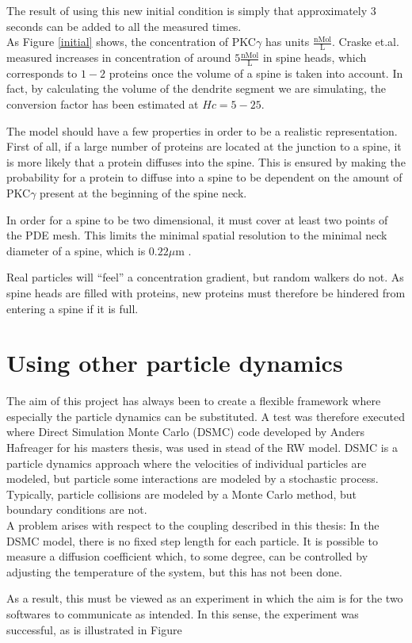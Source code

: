 \noindent The result of using this new initial condition is simply that approximately $3$ seconds can be added to all the measured times. \\

As Figure \ref{initial} shows, the concentration of PKC$\gamma$ has units $\frac{\text{nMol}}{\text{L}}$. 
Craske et.al. \cite{craske2005spines} measured increases in concentration of around $5\frac{\text{nMol}}{\text{L}}$ in spine heads, which corresponds to $1-2$ proteins once the volume of a spine is taken into account. 
In fact, by calculating the volume of the dendrite segment we are simulating, the conversion factor has been estimated at $Hc = 5-25$. 

The model should have a few properties in order to be a realistic representation. First of all, if a large number of proteins are located at the junction to a spine, it is more likely that a protein diffuses into the spine. This is ensured by making the probability for a protein to diffuse into a spine to be dependent on the amount of PKC$\gamma$ present at the beginning of the spine neck. 

In order for a spine to be two dimensional, it must cover at least two points of the PDE mesh. This limits the minimal spatial resolution to the minimal neck diameter of a spine, which is $0.22\mu$m \cite{arellano2007ultrastructure}.

Real particles will ``feel'' a concentration gradient, but random walkers do not. As spine heads are filled with proteins, new proteins must therefore be hindered from entering a spine if it is full. 

\section{Using other particle dynamics}

The aim of this project has always been to create a flexible framework where especially the particle dynamics can be substituted. 
A test was therefore executed where Direct Simulation Monte Carlo (DSMC) code developed by Anders Hafreager for his masters thesis, was used in stead of the RW model. 
DSMC is a particle dynamics approach where the velocities of individual particles are modeled, but particle some interactions are modeled by a stochastic process. 
Typically, particle collisions are modeled by a Monte Carlo method, but boundary conditions are not.\\

\noindent A problem arises with respect to the coupling described in this thesis: 
In the DSMC model, there is no fixed step length for each particle. It is possible to measure a diffusion coefficient which, to some degree, can be controlled by adjusting the temperature of the system, but this has not been done. 

As a result, this must be viewed as an experiment in which the aim is for the two softwares to communicate as intended. 
In this sense, the experiment was successful, as is illustrated in Figure 

